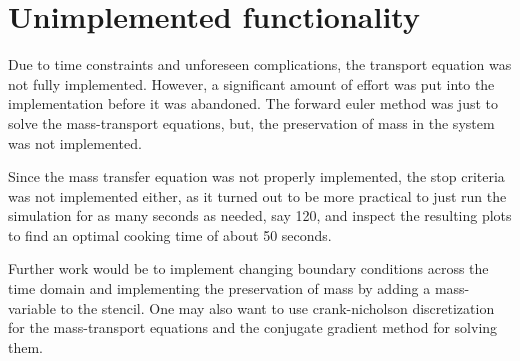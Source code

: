 \section{Unimplemented functionality}

Due to time constraints and unforeseen complications, the transport equation was
not fully implemented. However, a significant amount of effort was put into the implementation before it was 
abandoned. The forward euler method was just to solve the mass-transport equations,
but, the preservation of mass in the system was not implemented.

Since the mass transfer equation was not properly implemented, the stop criteria was not 
implemented either, as it turned out to be more practical to just run the simulation for as 
many seconds as needed, say 120, and inspect the resulting plots to find an
optimal cooking time of about 50 seconds.

Further work would be to implement changing boundary conditions across the time domain and
implementing the preservation of mass by adding a mass-variable to the stencil. One may
also want to use crank-nicholson discretization for the mass-transport equations and
the conjugate gradient method for solving them.

